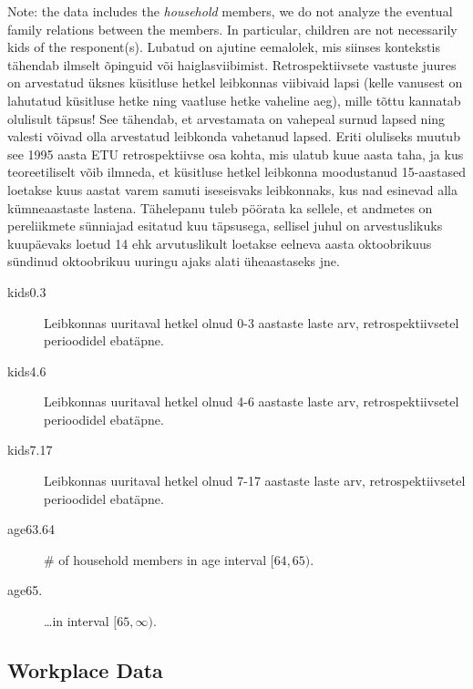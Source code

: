 \documentclass[a4paper]{article}
\begin{document}
Note: the data includes the \emph{household} members, we do not
analyze the eventual family relations between the members.  In
particular, children are not necessarily kids of the responent(s).
Lubatud on ajutine eemalolek, mis
siinses kontekstis tähendab ilmselt õpinguid või haiglasviibimist.
Retrospektiivsete vastuste juures on arvestatud üksnes küsitluse hetkel
leibkonnas viibivaid lapsi (kelle vanusest on lahutatud küsitluse hetke ning
vaatluse hetke vaheline aeg), mille tõttu kannatab olulisult täpsus! See
tähendab, et arvestamata on vahepeal surnud lapsed ning valesti võivad olla
arvestatud leibkonda vahetanud lapsed. Eriti oluliseks muutub see 1995 aasta ETU
retrospektiivse osa kohta, mis ulatub kuue aasta taha, ja kus teoreetiliselt
võib ilmneda, et küsitluse hetkel leibkonna moodustanud 15-aastased loetakse
kuus aastat varem samuti iseseisvaks leibkonnaks, kus nad esinevad alla
kümneaastaste lastena. 
Tähelepanu tuleb pöörata ka sellele, et andmetes on pereliikmete sünniajad
esitatud kuu täpsusega, sellisel juhul on arvestuslikuks kuupäevaks loetud 14
ehk arvutuslikult loetakse eelneva aasta oktoobrikuus sündinud oktoobrikuu
uuringu ajaks alati üheaastaseks jne.
\begin{description}
\item[kids0.3] Leibkonnas uuritaval hetkel olnud 0-3 aastaste laste
  arv, retrospektiivsetel perioodidel ebatäpne.
\item[kids4.6] Leibkonnas uuritaval hetkel olnud 4-6 aastaste laste
  arv, retrospektiivsetel perioodidel ebatäpne.
\item[kids7.17] Leibkonnas uuritaval hetkel
  olnud 7-17 aastaste laste arv, retrospektiivsetel perioodidel
  ebatäpne.
\item[age63.64] \# of household members in age interval $[64,65)$.
\item[age65.] \dots in interval $[65, \infty)$.
\end{description}

\subsection{Workplace Data}
\end{document}
